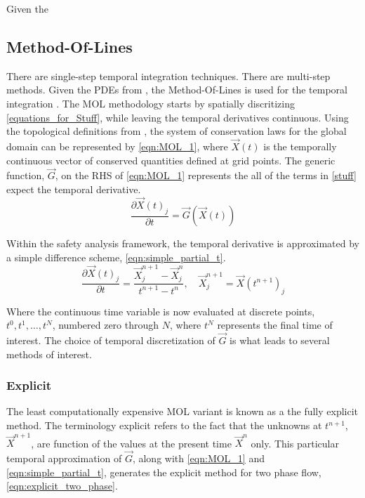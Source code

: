 Given the

\subsection{Method-Of-Lines}
\label{subsect:numerics_explicit}
There are single-step temporal integration techniques.
There are multi-step methods.
Given the PDEs from , the Method-Of-Lines is used for the temporal integration \cite{LeVeque2007}.
The MOL methodology starts by spatially discritizing \eqref{equations_for_Stuff}, while leaving the temporal derivatives continuous.
Using the topological definitions from , the system of conservation laws for the global domain can be represented by \eqref{eqn:MOL_1}, where $\vec{X}(t)$ is the temporally continuous vector of conserved quantities defined at grid points.
The generic function, $\vec{G}$, on the RHS of \eqref{eqn:MOL_1} represents the all of the terms in \eqref{stuff} expect the temporal derivative.
\begin{equation}
\label{eqn:MOL_1}
\frac{\partial \vec{X}(t)_j}{\partial t} = \vec{G}(\vec{X}(t))
\end{equation}

Within the safety analysis framework, the temporal derivative is approximated by a simple difference scheme, \eqref{eqn:simple_partial_t}.
\begin{equation}
\label{eqn:simple_partial_t}
\frac{\partial \vec{X}(t)_j}{\partial t} = \frac{ \vec{X}^{n+1}_{j} - \vec{X}^{n}_{j}}{t^{n+1}-t^{n}}, \quad \vec{X}^{n+1}_j = \vec{X}(t^{n+1})_j
\end{equation}

Where the continuous time variable is now evaluated at discrete points, $t^0, t^1, \ldots, t^N$, numbered zero through $N$, where $t^N$ represents the final time of interest.
The choice of temporal discretization of $\vec{G}$ is what leads to several methods of interest.

\subsubsection{Explicit}
\label{subsubsect:numerics_explicit}
The least computationally expensive MOL variant is known as a the fully explicit method.
The terminology explicit refers to the fact that the unknowns at $t^{n+1}$, $\vec{X}^{n+1}$, are function of the values at the present time $\vec{X}^{n}$ only.
This particular temporal approximation of $\vec{G}$, along with \eqref{eqn:MOL_1} and \eqref{eqn:simple_partial_t}, generates the explicit method for two phase flow, \eqref{eqn:explicit_two_phase}.

